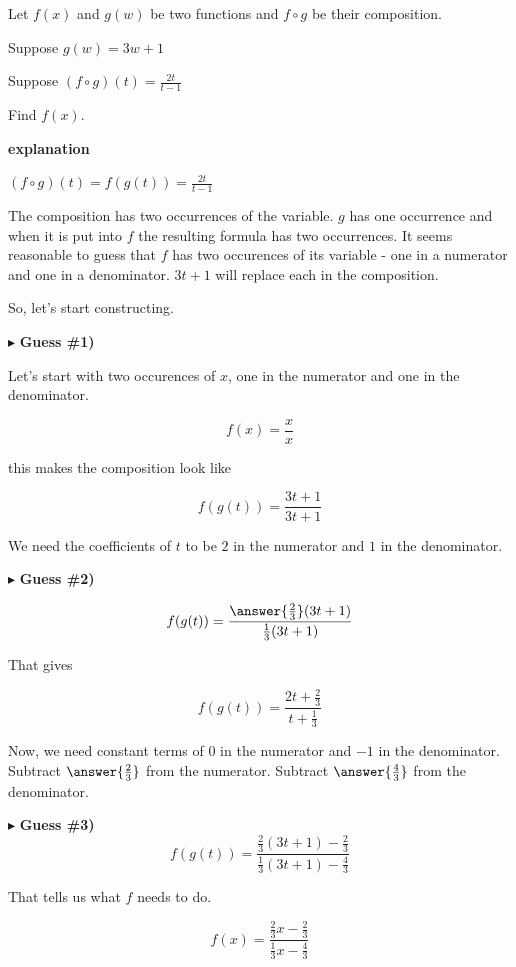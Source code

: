 \documentclass{ximera}
\begin{document}
\begin{example}


Let $f(x)$ and $g(w)$ be two functions and $f \circ g$ be their composition.


Suppose $g(w) = 3w + 1$ 

Suppose $(f \circ g)(t) = \frac{2t}{t-1}$


Find $f(x)$.



\textbf{\textcolor{red!75!green}{explanation}} 




$(f \circ g)(t) =  f(g(t)) =  \frac{2t}{t-1}$ 



The composition has two occurrences of the variable.  $g$ has one occurrence and when it is put into $f$ the resulting formula has two occurrences.  It seems reasonable to guess that $f$ has two occurences of its variable - one in a numerator and one in a denominator.  $3t + 1$ will replace each in the composition.

So, let's start constructing. 


$\blacktriangleright$  \textbf{\textcolor{blue!55!black}{Guess \#1)}}   

Let's start with two occurences of $x$, one in the numerator and one in the denominator.

\[      f(x) = \frac{x}{x}       \]


this makes the composition look like

\[   f(g(t)) =      \frac{3t + 1}{3t + 1}       \]



We need the coefficients of $t$ to be $2$ in the numerator and $1$ in the denominator.

$\blacktriangleright$  \textbf{\textcolor{blue!55!black}{Guess \#2)}}   

\[   f(g(t)) =      \frac{\answer{\frac{2}{3}}(3t + 1)}{\frac{1}{3}(3t + 1)}       \]

That gives


\[   f(g(t)) =      \frac{2t + \frac{2}{3}}{t + \frac{1}{3}}       \]



Now, we need constant terms of $0$ in the numerator and $-1$ in the denominator.  Subtract $\answer{\frac{2}{3}}$ from the numerator. Subtract $\answer{\frac{4}{3}}$ from the denominator. 

$\blacktriangleright$  \textbf{\textcolor{blue!55!black}{Guess \#3)}}   \\


\[   f(g(t)) =      \frac{\frac{2}{3}(3t + 1) - \frac{2}{3}}{\frac{1}{3}(3t + 1) - \frac{4}{3}}       \]

That tells us what $f$ needs to do.




\[   f(x) =      \frac{\frac{2}{3}x - \frac{2}{3}}{\frac{1}{3}x - \frac{4}{3}}       \]





\end{example}
\end{document}
